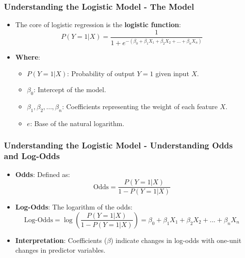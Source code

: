 \documentclass[aspectratio=169]{beamer}
\begin{document}
\begin{frame}[fragile]
    \frametitle{Understanding the Logistic Model - The Model}
    \begin{itemize}
        \item The core of logistic regression is the \textbf{logistic function}:
        \begin{equation}
            P(Y=1|X) = \frac{1}{1 + e^{-(\beta_0 + \beta_1X_1 + \beta_2X_2 + ... + \beta_nX_n)}}
        \end{equation}
        \item \textbf{Where}:
        \begin{itemize}
            \item \(P(Y=1|X)\): Probability of output \(Y=1\) given input \(X\).
            \item \(\beta_0\): Intercept of the model.
            \item \(\beta_1, \beta_2, ..., \beta_n\): Coefficients representing the weight of each feature \(X\).
            \item \(e\): Base of the natural logarithm.
        \end{itemize}
    \end{itemize}
\end{frame}

\begin{frame}[fragile]
    \frametitle{Understanding the Logistic Model - Understanding Odds and Log-Odds}
    \begin{itemize}
        \item \textbf{Odds}: Defined as:
        \begin{equation}
            \text{Odds} = \frac{P(Y=1|X)}{1 - P(Y=1|X)}
        \end{equation}
        \item \textbf{Log-Odds}: The logarithm of the odds:
        \begin{equation}
            \text{Log-Odds} = \log\left(\frac{P(Y=1|X)}{1 - P(Y=1|X)}\right) = \beta_0 + \beta_1X_1 + \beta_2X_2 + ... + \beta_nX_n
        \end{equation}
        \item \textbf{Interpretation}: Coefficients (\(\beta\)) indicate changes in log-odds with one-unit changes in predictor variables.
    \end{itemize}
\end{frame}
\end{document}
